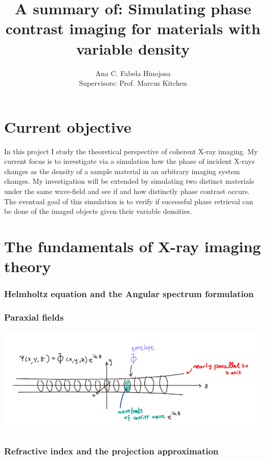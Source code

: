 \documentclass[9pt, a4paper]{article}
\title{A summary of: Simulating phase contrast imaging for materials with variable density}
\author{Ana C. Fabela Hinojosa \\
\small{Supervisors: Prof. Marcus Kitchen}}
\newenvironment{Figure}
    {\par\medskip\noindent\minipage{\linewidth}}
    {\endminipage\par\medskip}
\begin{document}
\maketitle
\section{Current objective}
In this project I study the theoretical perspective of coherent X-ray imaging. My current focus is to investigate via a simulation how the phase of incident X-rays changes as the density of a sample material in an arbitrary imaging system changes. My investigation will be extended by simulating two distinct materials under the same wave-field and see if and how distinctly phase contrast occurs. The eventual goal of this simulation is to verify if successful phase retrieval can be done of the imaged objects given their variable densities.

\section{The fundamentals of X-ray imaging theory}

\subsubsection{Helmholtz equation and the Angular spectrum formulation}

\subsubsection{Paraxial fields}

\begin{Figure}
\centering
\includegraphics[width=0.6\linewidth]{paraxial_beam.png}
\end{Figure}

\subsubsection{Refractive index and the projection approximation}
\end{document}
